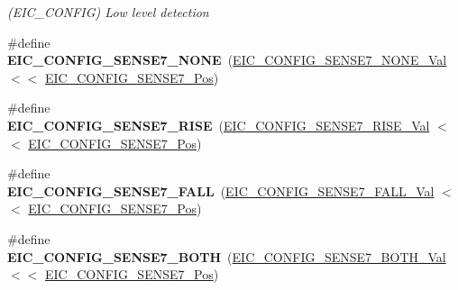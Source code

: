 \begin{DoxyCompactItemize}
\begin{DoxyCompactList}\small\item\em (E\+I\+C\+\_\+\+C\+O\+N\+F\+I\+G) Low level detection \end{DoxyCompactList}\item 
\hypertarget{group___s_a_m_l21___e_i_c_ga10033675399a7e1ce96cd0adba7969a3}{}\#define {\bfseries E\+I\+C\+\_\+\+C\+O\+N\+F\+I\+G\+\_\+\+S\+E\+N\+S\+E7\+\_\+\+N\+O\+N\+E}~(\hyperlink{group___s_a_m_l21___e_i_c_gad238f5412dacf421dc698fbb1e6be2f2}{E\+I\+C\+\_\+\+C\+O\+N\+F\+I\+G\+\_\+\+S\+E\+N\+S\+E7\+\_\+\+N\+O\+N\+E\+\_\+\+Val}    $<$$<$ \hyperlink{group___s_a_m_l21___e_i_c_ga19583c715708b15f578f5cc2a8f394fc}{E\+I\+C\+\_\+\+C\+O\+N\+F\+I\+G\+\_\+\+S\+E\+N\+S\+E7\+\_\+\+Pos})\label{group___s_a_m_l21___e_i_c_ga10033675399a7e1ce96cd0adba7969a3}

\item 
\hypertarget{group___s_a_m_l21___e_i_c_ga4da7e1c88d72147081f3cde64c67733e}{}\#define {\bfseries E\+I\+C\+\_\+\+C\+O\+N\+F\+I\+G\+\_\+\+S\+E\+N\+S\+E7\+\_\+\+R\+I\+S\+E}~(\hyperlink{group___s_a_m_l21___e_i_c_ga84e2898643261f390c3f329d59357cb6}{E\+I\+C\+\_\+\+C\+O\+N\+F\+I\+G\+\_\+\+S\+E\+N\+S\+E7\+\_\+\+R\+I\+S\+E\+\_\+\+Val}    $<$$<$ \hyperlink{group___s_a_m_l21___e_i_c_ga19583c715708b15f578f5cc2a8f394fc}{E\+I\+C\+\_\+\+C\+O\+N\+F\+I\+G\+\_\+\+S\+E\+N\+S\+E7\+\_\+\+Pos})\label{group___s_a_m_l21___e_i_c_ga4da7e1c88d72147081f3cde64c67733e}

\item 
\hypertarget{group___s_a_m_l21___e_i_c_ga11e90ceb16705cc83dcf38b9e1cb29ab}{}\#define {\bfseries E\+I\+C\+\_\+\+C\+O\+N\+F\+I\+G\+\_\+\+S\+E\+N\+S\+E7\+\_\+\+F\+A\+L\+L}~(\hyperlink{group___s_a_m_l21___e_i_c_ga456906de38943b836b26294cd9735251}{E\+I\+C\+\_\+\+C\+O\+N\+F\+I\+G\+\_\+\+S\+E\+N\+S\+E7\+\_\+\+F\+A\+L\+L\+\_\+\+Val}    $<$$<$ \hyperlink{group___s_a_m_l21___e_i_c_ga19583c715708b15f578f5cc2a8f394fc}{E\+I\+C\+\_\+\+C\+O\+N\+F\+I\+G\+\_\+\+S\+E\+N\+S\+E7\+\_\+\+Pos})\label{group___s_a_m_l21___e_i_c_ga11e90ceb16705cc83dcf38b9e1cb29ab}

\item 
\hypertarget{group___s_a_m_l21___e_i_c_ga12fccfbecfd7d16ca1fb13f84b089f17}{}\#define {\bfseries E\+I\+C\+\_\+\+C\+O\+N\+F\+I\+G\+\_\+\+S\+E\+N\+S\+E7\+\_\+\+B\+O\+T\+H}~(\hyperlink{group___s_a_m_l21___e_i_c_ga461a0f4bd20a83b7c935ba3fb4e640ac}{E\+I\+C\+\_\+\+C\+O\+N\+F\+I\+G\+\_\+\+S\+E\+N\+S\+E7\+\_\+\+B\+O\+T\+H\+\_\+\+Val}    $<$$<$ \hyperlink{group___s_a_m_l21___e_i_c_ga19583c715708b15f578f5cc2a8f394fc}{E\+I\+C\+\_\+\+C\+O\+N\+F\+I\+G\+\_\+\+S\+E\+N\+S\+E7\+\_\+\+Pos})\label{group___s_a_m_l21___e_i_c_ga12fccfbecfd7d16ca1fb13f84b089f17}


\end{DoxyCompactItemize}
